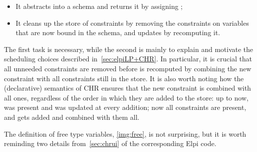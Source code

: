 \documentclass{these-ISSS}
\begin{document}
\begin{itemize}
  \item It abstracts  into a schema  and returns it by
    assigning ;
  \item It cleans up the store of constraints by removing the 
    constraints on variables that are now bound in the schema, and updates
     by recomputing it.
\end{itemize}

The first task is necessary, while the second is mainly to explain and
motivate the scheduling choices described in~\cref{sec:elpiLP+CHR}. In
particular, it is crucial that all unneeded  constraints are
removed before  is recomputed by combining the new constraint
with all  constraints still in the store. It is also worth
noting how the (declarative) semantics of CHR ensures that the new
 constraint is combined with all  ones, regardless
of the order in which they are added to the store: up to now, 
was present and was updated at every  addition; now all
 constraints are present, and  gets added and
combined with them all.

The definition of free type variables, \cref{img:free}, is not surprising,
but it is worth reminding two details 
from~\cref{sec:chrui} of the corresponding Elpi code.
\end{document}
